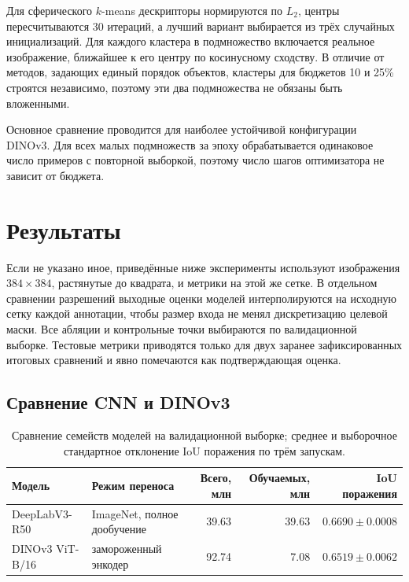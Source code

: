 \documentclass[a4paper,12pt]{extarticle}
\begin{document}
Для сферического $k$-means дескрипторы нормируются по $L_2$, центры
пересчитываются 30 итераций, а лучший вариант выбирается из трёх случайных
инициализаций. Для каждого кластера в подмножество включается реальное
изображение, ближайшее к его центру по косинусному сходству. В отличие от
методов, задающих единый порядок объектов, кластеры для бюджетов 10 и 25\%
строятся независимо, поэтому эти два подмножества не обязаны быть вложенными.

Основное сравнение проводится для наиболее устойчивой конфигурации DINOv3. Для всех
малых подмножеств за эпоху обрабатывается одинаковое число примеров с повторной
выборкой, поэтому число шагов оптимизатора не зависит от бюджета.

\section{Результаты}

Если не указано иное, приведённые ниже эксперименты используют изображения
$384\times384$, растянутые до квадрата, и метрики на этой же сетке. В отдельном
сравнении разрешений выходные оценки моделей интерполируются на исходную сетку каждой
аннотации, чтобы размер входа не менял дискретизацию целевой маски. Все
абляции и контрольные точки выбираются по валидационной выборке. Тестовые
метрики приводятся только для двух заранее зафиксированных итоговых сравнений
и явно помечаются как подтверждающая оценка.

\subsection{Сравнение CNN и DINOv3}

\begin{table}[ht]
  \caption{Сравнение семейств моделей на валидационной выборке; среднее и
  выборочное стандартное отклонение IoU поражения по трём запускам.}
  \label{tab:cnn-vs-dino}
  \centering
  \footnotesize
  \begin{tabular}{llrrr}
    \toprule
    Модель & Режим переноса & Всего, млн & Обучаемых, млн & IoU поражения \\
    \midrule
    DeepLabV3-R50 & ImageNet, полное дообучение & 39.63 & 39.63 &
      $\mathbf{0.6690\pm0.0008}$ \\
    DINOv3 ViT-B/16 & замороженный энкодер & 92.74 & 7.08 & $0.6519\pm0.0062$ \\
    \bottomrule
  \end{tabular}
\end{table}
\end{document}
